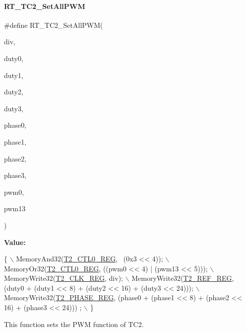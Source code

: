 \paragraph{\texorpdfstring{R\+T\+\_\+\+T\+C2\+\_\+\+Set\+All\+P\+WM}{RT\_TC2\_SetAllPWM}}
{\footnotesize\ttfamily \#define R\+T\+\_\+\+T\+C2\+\_\+\+Set\+All\+P\+WM(\begin{DoxyParamCaption}\item[{}]{div,  }\item[{}]{duty0,  }\item[{}]{duty1,  }\item[{}]{duty2,  }\item[{}]{duty3,  }\item[{}]{phase0,  }\item[{}]{phase1,  }\item[{}]{phase2,  }\item[{}]{phase3,  }\item[{}]{pwm0,  }\item[{}]{pwm13 }\end{DoxyParamCaption})}

{\bfseries Value\+:}
\begin{DoxyCode}
\{                                                                                               \(\backslash\)
        MemoryAnd32(\mbox{\hyperlink{a00020_adadaa0ab1ebbd7ba9b70dfd24c3ed44daf2e9deb36631241181cbf09e8d959475}{T2\_CTL0\_REG}}, ~(0x3 << 4));                                                  
          \(\backslash\)
        MemoryOr32(\mbox{\hyperlink{a00020_adadaa0ab1ebbd7ba9b70dfd24c3ed44daf2e9deb36631241181cbf09e8d959475}{T2\_CTL0\_REG}}, ((pwm0 << 4) | (pwm13 << 5)));                                  
          \(\backslash\)
        MemoryWrite32(\mbox{\hyperlink{a00020_adadaa0ab1ebbd7ba9b70dfd24c3ed44dab67d86aa158825e559813e0df3f74cc6}{T2\_CLK\_REG}}, div);                                                          
         \(\backslash\)
        MemoryWrite32(\mbox{\hyperlink{a00020_adadaa0ab1ebbd7ba9b70dfd24c3ed44da840de759e5083c864ed1c57dad568251}{T2\_REF\_REG}}, (duty0 + (duty1 << 8) + (duty2 << 16) + (duty3 << 24)));       
         \(\backslash\)
        MemoryWrite32(\mbox{\hyperlink{a00020_adadaa0ab1ebbd7ba9b70dfd24c3ed44da0e4e92920a475b537196369ae8274e7e}{T2\_PHASE\_REG}}, (phase0 + (phase1 << 8) + (phase2 << 16) + (phase3 << 24)))
      ;    \(\backslash\)
    \}
\end{DoxyCode}


This function sets the P\+WM function of T\+C2. 


